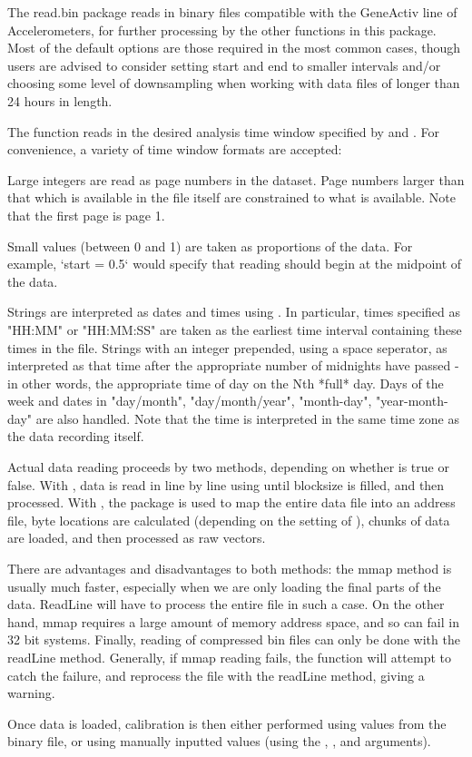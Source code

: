 \documentclass[a4paper]{book}
\begin{document}
\begin{Details}\relax
The read.bin package reads in binary files compatible with the GeneActiv line of Accelerometers, for further processing by the other functions in this package. Most of the default options are those required in the most common cases, though users are advised to consider setting start and end to smaller intervals and/or choosing some level of downsampling when working with data files of longer than 24 hours in length.

The function reads in the desired analysis time window specified by  and . For convenience, a variety of time window formats are accepted:

Large integers are read as page numbers in the dataset. Page numbers larger than that which is available in the file itself are constrained to what is available. Note that the first page is page 1.

Small values (between 0 and 1) are taken as proportions of the data. For example, `start = 0.5` would specify that reading should begin at the midpoint of the data.

Strings are interpreted as dates and times using . In particular, times specified as "HH:MM" or "HH:MM:SS" are taken as the earliest time interval containing these times in the file. Strings with an integer prepended, using a space seperator, as interpreted as that time after the appropriate number of midnights have passed - in other words, the appropriate time of day on the Nth *full* day. Days of the week and dates in "day/month", "day/month/year", "month-day", "year-month-day" are also handled. Note that the time is interpreted in the same time zone as the data recording itself.

Actual data reading proceeds by two methods, depending on whether  is true or false. With , data is read in line by line using  until blocksize is filled, and then processed. With , the  package is used to map the entire data file into an address file, byte locations are calculated (depending on the setting of ),  chunks of data are loaded, and then processed as raw vectors. 

There are advantages and disadvantages to both methods: the mmap method is usually much faster, especially when we are only loading the final parts of the data. ReadLine will have to process the entire file in such a case. On the other hand, mmap requires a large amount of memory address space, and so can fail in 32 bit systems. Finally, reading of compressed bin files can only be done with the readLine method. Generally, if mmap reading fails, the function will attempt to catch the failure, and reprocess the file with the readLine method, giving a warning.

Once data is loaded, calibration is then either performed using values from the binary file, or using manually inputted values (using the , , and  arguments).

\end{Details}
\end{document}
